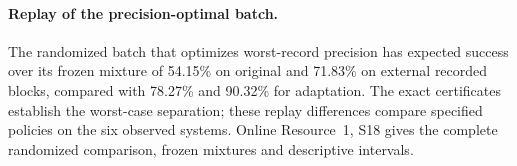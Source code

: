 \paragraph{Replay of the precision-optimal batch.}
The randomized batch that optimizes worst-record precision has expected
success over its frozen mixture of 54.15\% on original and 71.83\% on external
recorded blocks, compared with 78.27\% and 90.32\% for adaptation.
The exact certificates establish the
worst-case separation; these replay differences compare specified policies
on the six observed systems. Online Resource~1, S18 gives the complete
randomized comparison, frozen mixtures and descriptive intervals.
